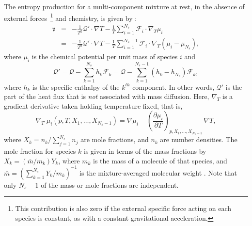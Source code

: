 \documentclass[11pt]{article}
\newcommand{\HeatFlux}{\boldsymbol{\mathcal{Q}}}
\newcommand{\SpeciesFlux}{\boldsymbol{\mathcal{F}}}
\newcommand{\EntropyProduction}{\mathfrak{v}}
\begin{document}
The entropy production for a
multi-component mixture at rest, in the absence of external forces~\footnote{This contribution
is also zero if the external specific force
acting on each species is constant, as with a constant gravitational acceleration.} and chemistry,
is given by \cite{DM_63}:
%
\begin{eqnarray}
\EntropyProduction &=&
-\frac{1}{T^2} \HeatFlux' \cdot \nabla T
- \frac{1}{T} \sum_{i=1}^{N_s} \SpeciesFlux_i \cdot \nabla_T \mu_i \\
&=& -\frac{1}{T^2} \HeatFlux' \cdot \nabla T
- \frac{1}{T} \sum_{i=1}^{N_s-1} \SpeciesFlux_i \cdot \nabla_T \left(\mu_i - \mu_{N_s} \right ),
\label{eq:dGM1}
\end{eqnarray}
%
where $\mu_i$ is the chemical potential per unit mass of species $i$ and
\begin{equation}
\HeatFlux' = \HeatFlux - \sum_{k=1}^{N_s} h_k \SpeciesFlux_k
= \HeatFlux - \sum_{k=1}^{N_s-1} (h_k-h_{N_s}) \SpeciesFlux_k,
\end{equation}
where $h_k $ is the specific enthalpy of the $k^{th}$ component.
In other words, $\HeatFlux'$ is the part of the heat flux that is \emph{not} associated with mass diffusion.
Here, $\nabla_T$ is a gradient derivative taken holding temperature fixed, that is,
\[
\nabla_T  \; \mu_i(p,T,X_1, \ldots, X_{N_s-1}) = \nabla \mu_i -
\left(\frac{\partial \mu_i}{\partial T}\right)_{p,X_1, \ldots, X_{N_s-1}}\, \nabla T,
\]
where $X_k=n_k/\sum_{j=1}^{N_s} n_j$ are mole fractions, and $n_k$ are number densities.
The mole fraction for species $k$ is given in terms of the mass fractions by $X_k = ({\overline{m}}/{m_k}) Y_k$,
where $m_k$ is the
mass of a molecule of that species, and $\overline{m}=\left( \sum_{k=1}^{N_s}Y_k / m_k \right)^{-1}$ is the mixture-averaged molecular weight \cite{NewIrrevThermoBook}.  Note that only $N_s-1$ of the mass or mole fractions are independent.
%
\end{document}
